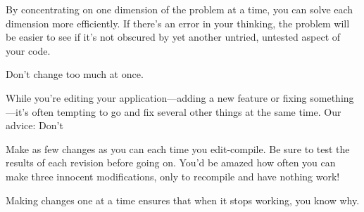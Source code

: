 By concentrating on one dimension of the problem at a time, you can
solve each dimension more efficiently. If there's an error in your
thinking, the problem will be easier to see if it's not obscured by yet
another untried, untested aspect of your code.

\begin{tip}
Don't change too much at once.
\end{tip}
While you're editing your application---adding a new feature or fixing
something---it's often tempting to go and fix several other things at
the same time. Our advice: Don't

Make as few changes as you can each time you edit-compile. Be sure to
test the results of each revision before going on. You'd be amazed how
often you can make three innocent modifications, only to recompile and
have nothing work!

Making changes one at a time ensures that when it stops working, you
know why.


